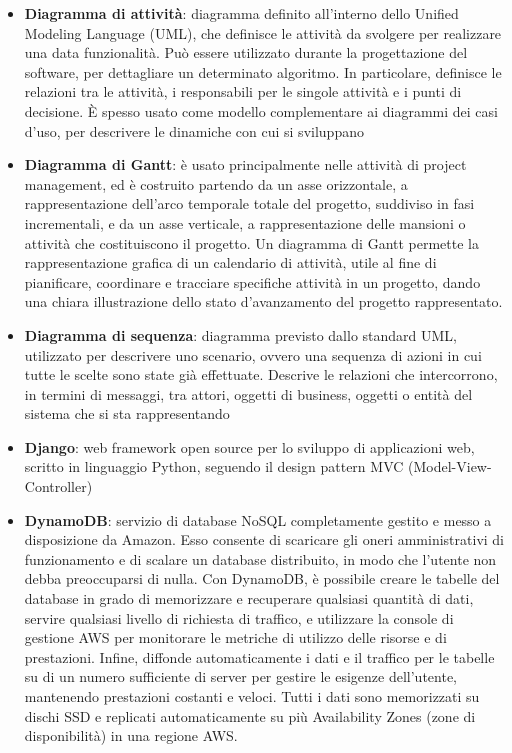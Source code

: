 \begin{itemize}
	\item \textbf{Diagramma di attività}: diagramma definito all'interno dello Unified Modeling Language (UML), che definisce le attività da svolgere per realizzare una data funzionalità. Può essere utilizzato durante la progettazione del software, per dettagliare un determinato algoritmo. In particolare, definisce le relazioni tra le attività, i responsabili per le singole attività e i punti di decisione. \MakeUppercase{è} spesso usato come modello complementare ai diagrammi dei casi d'uso, per descrivere le dinamiche con cui si sviluppano
	\item \textbf{Diagramma di Gantt}: è usato principalmente nelle attività di project management, ed è costruito partendo da un asse orizzontale, a rappresentazione dell'arco temporale totale del progetto, suddiviso in fasi incrementali, e da un asse verticale, a rappresentazione delle mansioni o attività che costituiscono il progetto. Un diagramma di Gantt permette la rappresentazione grafica di un calendario di attività, utile al fine di pianificare, coordinare e tracciare specifiche attività in un progetto, dando una chiara illustrazione dello stato d'avanzamento del progetto rappresentato.
	\item \textbf{Diagramma di sequenza}: diagramma previsto dallo standard UML, utilizzato per descrivere uno scenario, ovvero una sequenza di azioni in cui tutte le scelte sono state già effettuate. Descrive le relazioni che intercorrono, in termini di messaggi, tra attori, oggetti di business, oggetti o entità del sistema che si sta rappresentando
	\item \textbf{Django}: web framework open source per lo sviluppo di applicazioni web, scritto in linguaggio Python, seguendo il design pattern MVC (Model-View-Controller)
	\item \textbf{DynamoDB}: servizio di database NoSQL completamente gestito e messo a disposizione da Amazon. Esso consente di scaricare gli oneri amministrativi di funzionamento e di scalare un database distribuito, in modo che l'utente non debba preoccuparsi di nulla.
	Con DynamoDB, è possibile creare le tabelle del database in grado di memorizzare e recuperare qualsiasi quantità di dati, servire qualsiasi livello di richiesta di traffico, e utilizzare la console di gestione AWS per monitorare le metriche di utilizzo delle risorse e di prestazioni. Infine, diffonde automaticamente i dati e il traffico per le tabelle su di un numero sufficiente di server per gestire le esigenze dell'utente, mantenendo prestazioni costanti e veloci. Tutti i dati sono memorizzati su dischi SSD e replicati automaticamente su più Availability Zones (zone di disponibilità) in una regione AWS.
\end{itemize}


